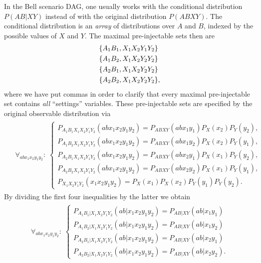 In the Bell scenario DAG, one usually works with the conditional distribution $P(AB|XY)$ instead of with the original distribution $P(ABXY)$. The conditional distribution is an \emph{array} of distributions over $A$ and $B$, indexed by the possible values of $X$ and $Y$. The maximal pre-injectable sets then are
\begin{align}\begin{split}
&\brackets{A_1 B_1, X_1 X_2 Y_1 Y_2} \\
&\brackets{A_1 B_2, X_1 X_2 Y_2 Y_2} \\
&\brackets{A_2 B_1, X_1 X_2 Y_2 Y_2} \\
&\brackets{A_2 B_2, X_1 X_2 Y_2 Y_2} ,
\end{split}\end{align}
where we have put commas in order to clarify that every maximal pre-injectable set contains \emph{all} ``settings'' variables. These pre-injectable sets are specified by the original observable distribution via
\begin{align}\begin{split}&\forall_{a b x_1 x_2 y_1 y_2}:\; \begin{cases}
	P_{A_1 B_1 X_1 X_2 Y_1 Y_2}(a b x_1 x_2 y_1 y_2)  = P_{A B X Y}(a b x_1 y_1) P_X(x_2) P_Y(y_2), \\
	P_{A_1 B_2 X_1 X_2 Y_1 Y_2}(a b x_1 x_2 y_1 y_2)  = P_{A B X Y}(a b x_1 y_2) P_X(x_2) P_Y(y_1), \\
	P_{A_2 B_1 X_1 X_2 Y_1 Y_2}(a b x_1 x_2 y_1 y_2)  = P_{A B X Y}(a b x_2 y_1) P_X(x_1) P_Y(y_2), \\
	P_{A_2 B_2 X_1 X_2 Y_1 Y_2}(a b x_1 x_2 y_1 y_2)  = P_{A B X Y}(a b x_2 y_2) P_X(x_1) P_Y(y_1), \\
		P_{X_1 X_2 Y_1 Y_2}(x_1 x_2 y_1 y_2)  = P_X(x_1) P_X(x_2) P_Y(y_1) P_Y(y_2).
\end{cases}\end{split}\end{align}
By dividing the first four inequalities by the latter we obtain
\begin{align}\begin{split}\forall_{a b x_1 x_2 y_1 y_2}:\; \begin{cases}
	P_{A_1 B_1 | X_1 X_2 Y_1 Y_2}(a b | x_1 x_2 y_1 y_2)  = P_{A B | X Y}(a b | x_1 y_1) \\
	P_{A_1 B_2 | X_1 X_2 Y_1 Y_2}(a b | x_1 x_2 y_1 y_2)  = P_{A B | X Y}(a b | x_1 y_2) \\
	P_{A_2 B_1 | X_1 X_2 Y_1 Y_2}(a b | x_1 x_2 y_1 y_2)  = P_{A B | X Y}(a b | x_2 y_1) \\
	P_{A_2 B_2 | X_1 X_2 Y_1 Y_2}(a b | x_1 x_2 y_1 y_2)  = P_{A B | X Y}(a b | x_2 y_2).
\end{cases}\end{split}\end{align}
